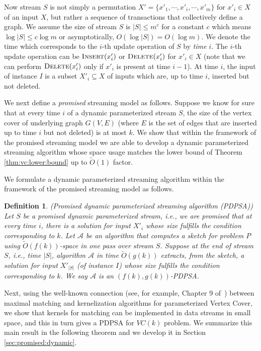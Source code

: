 \documentclass[11pt,letter]{article}
\newtheorem{definition}[theorem]{Definition}
\begin{document}
Now stream $S$ is not simply a permutation
$X'=\{x'_1,\cdots,x'_i,\cdots, x'_m\}$ for $x'_i\in X$ of an input
$X$, but rather a sequence of transactions that collectively define a
graph. We assume the size of stream $S$
is $|S|\le m^c$ for a constant $c$ which means  $\log|S|\le c\log m$
or asymptotically, $O(\log|S|)= O(\log m)$. We denote the time which corresponds to
the $i$-th update operation of $S$ by \textit{time} $i$. The $i$-th update operation
can be $\textsc{Insert}(x'_i)$ or $\textsc{Delete}(x'_i)$ for $x'_i\in X$
(note that we can perform $\textsc{Delete}(x'_i)$ only if $x'_i$ is
present at time $i-1$). At time $i$,
the input of instance $I$ is a subset $X'_i\subseteq X$ of inputs
which are, up to time $i$, inserted but not deleted.


We next define a \textit{promised} streaming model as follows.
Suppose we know for sure that at every time $i$ of a dynamic parameterized
stream $S$, the size of the vertex cover of underlying graph $G(V,E)$ (where $E$
is the set of edges that are inserted up to time $i$ but not deleted)
is at most $k$. We show that within the framework of the
promised streaming model we are able to develop a dynamic parameterized
streaming algorithm whose space usage matches the lower bound of
Theorem \ref{thm:vc:lower:bound} up to $\tilde{O}(1)$ factor.



We formulate a dynamic parameterized streaming algorithm within the framework of
the promised streaming model as follows.


\begin{definition}
({\sc Promised dynamic parameterized streaming algorithm (PDPSA)})
Let  $S$ be a promised dynamic parameterized stream, i.e., we are promised
that at every time $i$, there is  a solution for input $X'_i$
whose  size fulfills the condition corresponding to $k$.
Let  $\mathcal{A}$ be an algorithm  that computes a sketch for problem $P$
using $\tilde{O}(f(k))$-space in one pass over stream $S$.
Suppose at the end of stream $S$, i.e., time $|S|$, algorithm $\mathcal{A}$
in time $\tilde{O}(g(k))$ extracts,  from the sketch,
a solution for input $X'_{|S|}$ (of instance $I$) whose  size fulfills
the condition corresponding to $k$.
We say $\mathcal{A}$ is an $(f(k), g(k))$-PDPSA.
\end{definition}



Next, using the well-known connection (see, for example, Chapter 9 of~\cite{FG06})
between maximal matching and kernelization algorithms for parameterized Vertex Cover,
we show that kernels for matching can be implemented in data streams in small space, and
this in turn gives  a PDPSA for $VC(k)$ problem.
We summarize this main result in the following theorem and
we develop it in Section \ref{sec:promised:dynamic}.
\end{document}

